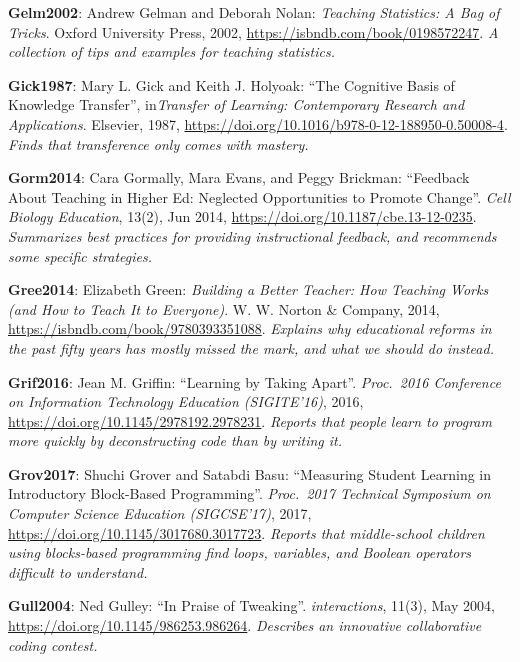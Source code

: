 \textbf{\hypertarget{b:Gelm2002}{Gelm2002}\label{b:Gelm2002}}: Andrew Gelman and Deborah Nolan: \emph{Teaching Statistics: A Bag of Tricks}. Oxford University Press, 2002, \url{https://isbndb.com/book/0198572247}. \emph{A collection of tips and examples for teaching statistics.}

\textbf{\hypertarget{b:Gick1987}{Gick1987}\label{b:Gick1987}}: Mary L. Gick and Keith J. Holyoak: ``The Cognitive Basis of Knowledge Transfer'', in\emph{Transfer of Learning: Contemporary Research and Applications}. Elsevier, 1987, \url{https://doi.org/10.1016/b978-0-12-188950-0.50008-4}. \emph{Finds that transference only comes with mastery.}

\textbf{\hypertarget{b:Gorm2014}{Gorm2014}\label{b:Gorm2014}}: Cara Gormally, Mara Evans, and Peggy Brickman: ``Feedback About Teaching in Higher Ed: Neglected Opportunities to Promote Change''. \emph{Cell Biology Education}, 13(2), Jun 2014, \url{https://doi.org/10.1187/cbe.13-12-0235}. \emph{Summarizes best practices for providing instructional feedback, and recommends some specific strategies.}

\textbf{\hypertarget{b:Gree2014}{Gree2014}\label{b:Gree2014}}: Elizabeth Green: \emph{Building a Better Teacher: How Teaching Works (and How to Teach It to Everyone)}. W. W. Norton \& Company, 2014, \url{https://isbndb.com/book/9780393351088}. \emph{Explains why educational reforms in the past fifty years has mostly missed the mark, and what we should do instead.}

\textbf{\hypertarget{b:Grif2016}{Grif2016}\label{b:Grif2016}}: Jean M. Griffin: ``Learning by Taking Apart''. \emph{Proc.\ 2016 Conference on Information Technology Education (SIGITE'16)}, 2016, \url{https://doi.org/10.1145/2978192.2978231}. \emph{Reports that people learn to program more quickly by deconstructing code than by writing it.}

\textbf{\hypertarget{b:Grov2017}{Grov2017}\label{b:Grov2017}}: Shuchi Grover and Satabdi Basu: ``Measuring Student Learning in Introductory Block-Based Programming''. \emph{Proc.\ 2017 Technical Symposium on Computer Science Education (SIGCSE'17)}, 2017, \url{https://doi.org/10.1145/3017680.3017723}. \emph{Reports that middle-school children using blocks-based programming find loops, variables, and Boolean operators difficult to understand.}

\textbf{\hypertarget{b:Gull2004}{Gull2004}\label{b:Gull2004}}: Ned Gulley: ``In Praise of Tweaking''. \emph{interactions}, 11(3), May 2004, \url{https://doi.org/10.1145/986253.986264}. \emph{Describes an innovative collaborative coding contest.}

